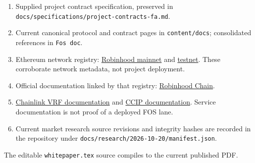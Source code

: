 \documentclass[
  10pt,
  letterpaper,
]{article}
\providecommand{\tightlist}{%
  \setlength{\itemsep}{0pt}\setlength{\parskip}{0pt}}
\begin{document}
\begin{enumerate}
\def\labelenumi{\arabic{enumi}.}
\tightlist
\item
  Supplied project contract specification, preserved in
  \texttt{docs/specifications/project-contracts-fa.md}.
\item
  Current canonical protocol and contract pages in
  \texttt{content/docs}; consolidated references in \texttt{Fos\ doc}.
\item
  Ethereum network registry:
  \href{https://github.com/ethereum-lists/chains/blob/master/_data/chains/eip155-4663.json}{Robinhood
  mainnet} and
  \href{https://github.com/ethereum-lists/chains/blob/master/_data/chains/eip155-46630.json}{testnet}.
  These corroborate network metadata, not project deployment.
\item
  Official documentation linked by that registry:
  \href{https://docs.robinhood.com/chain}{Robinhood Chain}.
\item
  \href{https://docs.chain.link/vrf}{Chainlink VRF documentation} and
  \href{https://docs.chain.link/ccip}{CCIP documentation}. Service
  documentation is not proof of a deployed FOS lane.
\item
  Current market research source revisions and integrity hashes are
  recorded in the repository under
  \texttt{docs/research/2026-10-20/manifest.json}.
\end{enumerate}

The editable \texttt{whitepaper.tex} source compiles to the current
published PDF.
\end{document}
